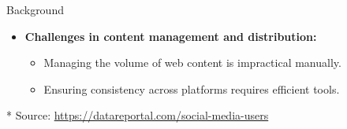 \documentclass{beamer}
\begin{document}
\begin{frame}{Background}
        \vspace{0.5cm}
        \begin{itemize}
            \item \textbf{Challenges in content management and distribution:}
            \begin{itemize}
                \item Managing the volume of web content is impractical manually.
                \item Ensuring consistency across platforms requires efficient tools.
            \end{itemize}
        \end{itemize}

        \vspace{1.25cm}
        {\tiny \** Source: \url{https://datareportal.com/social-media-users}}
    \end{frame}
\end{document}
